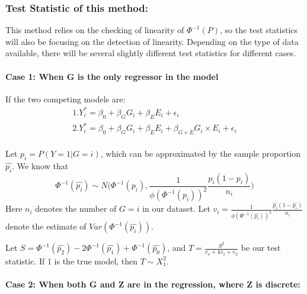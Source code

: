 \documentclass[
]{article}
\begin{document}
\hypertarget{test-statistic-of-this-method}{%
\subsubsection{Test Statistic of this
method:}\label{test-statistic-of-this-method}}

This method relies on the checking of linearity of \(\Phi^{-1}(P)\), so
the test statistics will also be focusing on the detection of linearity.
Depending on the type of data available, there will be several slightly
different test statistics for different cases.

\hypertarget{case-1-when-g-is-the-only-regressor-in-the-model}{%
\paragraph{Case 1: When G is the only regressor in the
model}\label{case-1-when-g-is-the-only-regressor-in-the-model}}

If the two competing models are: \begin{equation}
\begin{aligned}
1. Y_i ^{*} = \beta_0 + \beta_G G_i + \beta_E E_i + \epsilon_i \\
2. Y_i ^{*} = \beta_0 + \beta_G G_i + \beta_E E_i + \beta_{G\times E}G_i \times E_i + \epsilon_i \\
\end{aligned}
\end{equation}

Let \(p_i = P(Y = 1|G=i)\), which can be approximated by the sample
proportion \(\hat{p_i}\). We know that
\[\Phi^{-1}(\hat{p_i}) \sim N\bigg(\Phi^{-1}(p_i), \frac{1}{\phi(\Phi^{-1}(p_i))^2} \frac{p_i(1-p_i)}{n_i}\bigg)\]
Here \(n_i\) denotes the number of \(G = i\) in our dataset. Let
\(v_i = \frac{1}{\phi(\Phi^{-1}(\hat{p_i}))^2} \frac{\hat{p_i}(1-\hat{p_i})}{n_i}\)
denote the estimate of \(Var(\Phi^{-1}(\hat{p_i}))\).

Let
\(S = \Phi^{-1}(\hat{p_2}) - 2\Phi^{-1}(\hat{p_1}) + \Phi^{-1}(\hat{p_0})\),
and \(T = \frac{S^2}{v_o+4v_1+v_2}\) be our test statistic. If 1 is the
true model, then \(T \sim X^2_{1}\).

\hypertarget{case-2-when-both-g-and-z-are-in-the-regression-where-z-is-discrete}{%
\paragraph{Case 2: When both G and Z are in the regression, where Z is
discrete:}\label{case-2-when-both-g-and-z-are-in-the-regression-where-z-is-discrete}}
\end{document}
